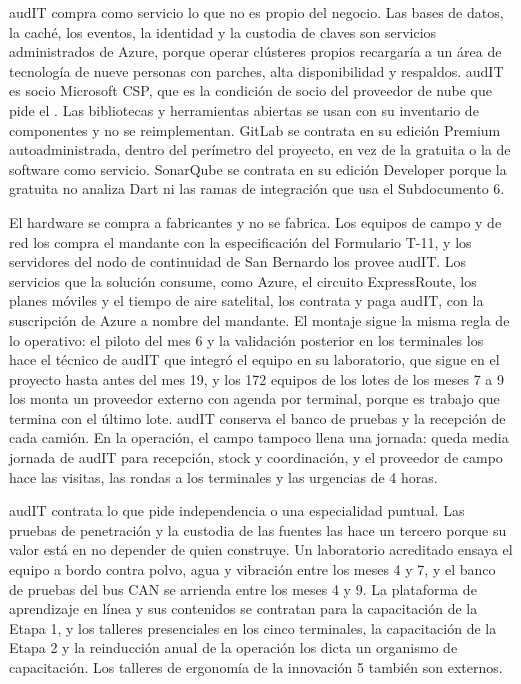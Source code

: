 audIT compra como servicio lo que no es propio del negocio. Las bases de datos, la caché, los eventos, la
identidad y la custodia de claves son servicios administrados de Azure, porque operar clústeres propios
recargaría a un área de tecnología de nueve personas  con parches, alta
disponibilidad y respaldos. audIT es socio Microsoft CSP, que es la condición de socio del proveedor de
nube que pide el . Las bibliotecas y herramientas abiertas se usan con su inventario de
componentes y no se reimplementan. GitLab se contrata en su edición Premium autoadministrada, dentro del
perímetro del proyecto, en vez de la gratuita o la de software como servicio. SonarQube se contrata en su
edición Developer porque la gratuita no analiza Dart ni las ramas de integración que usa el
Subdocumento 6.

El hardware se compra a fabricantes y no se fabrica. Los equipos de campo y de red los compra el
mandante con la especificación del Formulario T-11, y los servidores del nodo de continuidad de San
Bernardo los provee audIT.
Los servicios que la solución consume, como Azure, el circuito ExpressRoute, los planes móviles y el
tiempo de aire satelital, los contrata y paga audIT, con la suscripción de Azure a nombre del mandante.
El montaje sigue la misma regla de lo operativo: el piloto del mes 6 y la validación posterior en los
terminales los hace el técnico de audIT que integró el equipo en su laboratorio, que sigue en el proyecto
hasta antes del mes 19, y los 172 equipos de los lotes de
los meses 7 a 9 los monta un proveedor externo con agenda por terminal, porque es trabajo que termina con
el último lote. audIT conserva el banco de pruebas y la recepción de cada camión. En la operación, el
campo tampoco llena una jornada: queda media jornada de audIT para recepción, stock y coordinación, y el
proveedor de campo hace las visitas, las rondas a los terminales y las urgencias de 4 horas.

audIT contrata lo que pide independencia o una especialidad puntual. Las pruebas de penetración y la
custodia de las fuentes las hace un tercero porque su valor está en no depender de quien construye. Un
laboratorio acreditado ensaya el equipo a bordo contra polvo, agua y vibración entre los meses 4 y 7, y
el banco de pruebas del bus CAN se arrienda entre los meses 4 y 9. La plataforma de aprendizaje en línea
y sus contenidos se contratan para la capacitación de la Etapa 1, y los talleres presenciales en los
cinco terminales, la capacitación de la Etapa 2 y la reinducción anual de la operación los dicta un
organismo de capacitación. Los talleres de ergonomía de la innovación 5 también son externos.

